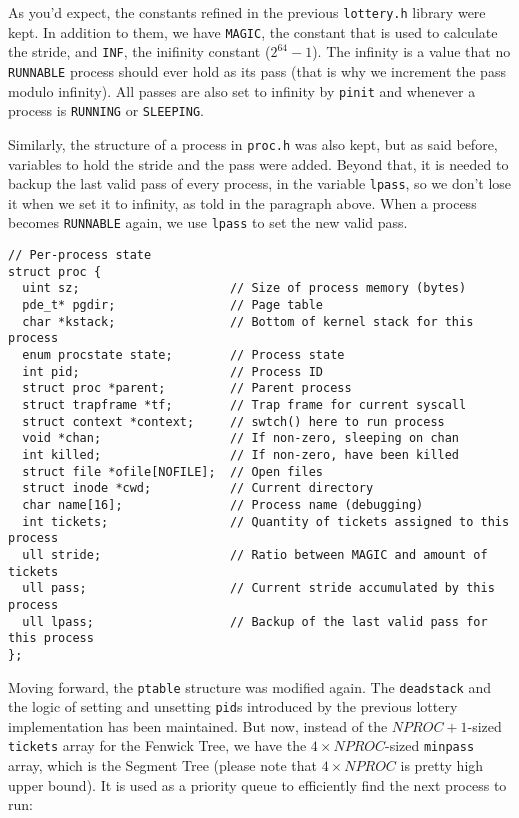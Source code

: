 \documentclass[12pt]{article}
\begin{document}
As you'd expect, the constants refined in the previous \texttt{lottery.h} library were kept. In addition to them, we have \texttt{MAGIC}, the constant that is used to calculate the stride, and \texttt{INF}, the inifinity constant ($2^{64} - 1$). The infinity is a value that no \texttt{RUNNABLE} process should ever hold as its pass (that is why we increment the pass modulo infinity). All passes are also set to infinity by \texttt{pinit} and whenever a process is \texttt{RUNNING} or \texttt{SLEEPING}.

Similarly, the structure of a process in \texttt{proc.h} was also kept, but as said before, variables to hold the stride and the pass were added. Beyond that, it is needed to backup the last valid pass of every process, in the variable \texttt{lpass}, so we don't lose it when we set it to infinity, as told in the paragraph above. When a process becomes \texttt{RUNNABLE} again, we use \texttt{lpass} to set the new valid pass.

\newpage

\begin{scriptsize}
\begin{verbatim}
// Per-process state
struct proc {
  uint sz;                     // Size of process memory (bytes)
  pde_t* pgdir;                // Page table
  char *kstack;                // Bottom of kernel stack for this process
  enum procstate state;        // Process state
  int pid;                     // Process ID
  struct proc *parent;         // Parent process
  struct trapframe *tf;        // Trap frame for current syscall
  struct context *context;     // swtch() here to run process
  void *chan;                  // If non-zero, sleeping on chan
  int killed;                  // If non-zero, have been killed
  struct file *ofile[NOFILE];  // Open files
  struct inode *cwd;           // Current directory
  char name[16];               // Process name (debugging)
  int tickets;                 // Quantity of tickets assigned to this process
  ull stride;                  // Ratio between MAGIC and amount of tickets
  ull pass;                    // Current stride accumulated by this process
  ull lpass;                   // Backup of the last valid pass for this process
};
\end{verbatim}
\end{scriptsize}

Moving forward, the \texttt{ptable} structure was modified again. The \texttt{deadstack} and the logic of setting and unsetting \texttt{pid}s introduced by the previous lottery implementation has been maintained. But now, instead of the $NPROC + 1$-sized \texttt{tickets} array for the Fenwick Tree, we have the $4 \times NPROC$-sized \texttt{minpass} array, which is the Segment Tree (please note that $4 \times NPROC$ is pretty high upper bound). It is used as a priority queue to efficiently find the next process to run:
\end{document}
